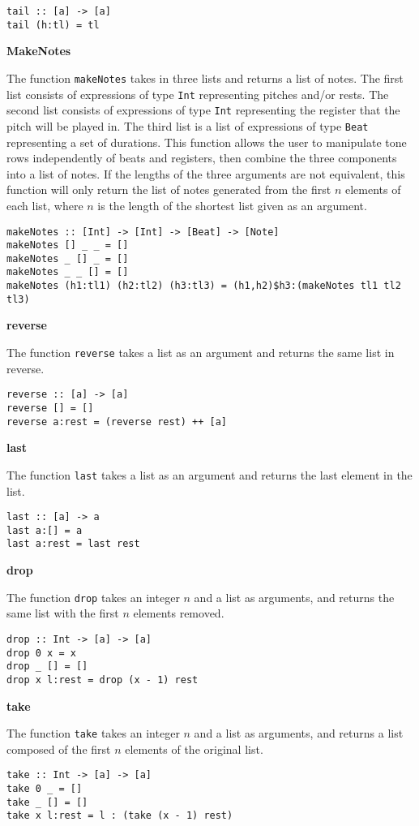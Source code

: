 \begin{verbatim}
tail :: [a] -> [a]
tail (h:tl) = tl
\end{verbatim} 


\noindent\textbf{MakeNotes}

The function \texttt{makeNotes} takes in three lists and returns a list 
of notes. The first list consists of expressions of type \texttt{Int} representing 
pitches and/or rests. The second list consists of expressions of type \texttt{Int}
representing the register that the pitch will be played in. The third list is a list 
of expressions of type \texttt{Beat} representing a set of durations.  This function allows the user 
to manipulate tone rows independently of beats and registers, then combine the three components
into a list of notes. If the lengths of the three arguments are not equivalent, this function
will only return the list of notes generated from the first $n$ elements of each list, where $n$ is the
length of the shortest list given as an argument.

\begin{verbatim}
makeNotes :: [Int] -> [Int] -> [Beat] -> [Note]
makeNotes [] _ _ = []
makeNotes _ [] _ = []
makeNotes _ _ [] = []
makeNotes (h1:tl1) (h2:tl2) (h3:tl3) = (h1,h2)$h3:(makeNotes tl1 tl2 tl3)
\end{verbatim}


\noindent \textbf{reverse}

The function \texttt{reverse} takes a list as an argument and returns the same list in reverse.

\begin{verbatim}
reverse :: [a] -> [a]
reverse [] = []
reverse a:rest = (reverse rest) ++ [a]
\end{verbatim}


\noindent \textbf{last}

The function \texttt{last} takes a list as an argument and returns the last element in the list.

\begin{verbatim}
last :: [a] -> a
last a:[] = a
last a:rest = last rest
\end{verbatim}

\noindent \textbf{drop}

The function \texttt{drop} takes an integer $n$ and a list as arguments, and returns the same list
with the first $n$ elements removed.

\begin{verbatim}
drop :: Int -> [a] -> [a]
drop 0 x = x
drop _ [] = []
drop x l:rest = drop (x - 1) rest
\end{verbatim}

\noindent \textbf{take}

The function \texttt{take} takes an integer $n$ and a list as arguments, and returns a list composed
of the first $n$ elements of the original list.

\begin{verbatim}
take :: Int -> [a] -> [a]
take 0 _ = []
take _ [] = []
take x l:rest = l : (take (x - 1) rest)
\end{verbatim}
